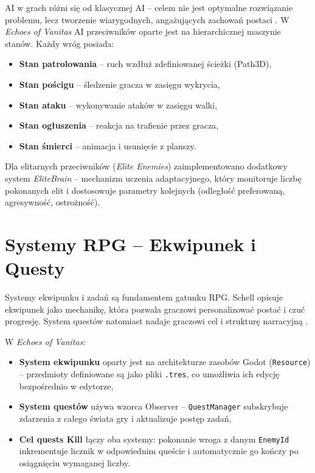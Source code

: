 AI w grach różni się od klasycznej AI – celem nie jest optymalne rozwiązanie problemu, lecz tworzenie wiarygodnych, angażujących zachowań postaci \cite{millington2009ai}. W \textit{Echoes of Vanitas} AI przeciwników oparte jest na hierarchicznej maszynie stanów. Każdy wróg posiada:

\begin{itemize}
    \item \textbf{Stan patrolowania} – ruch wzdłuż zdefiniowanej ścieżki (Path3D),
    \item \textbf{Stan pościgu} – śledzenie gracza w zasięgu wykrycia,
    \item \textbf{Stan ataku} – wykonywanie ataków w zasięgu walki,
    \item \textbf{Stan ogłuszenia} – reakcja na trafienie przez gracza,
    \item \textbf{Stan śmierci} – animacja i usunięcie z planszy.
\end{itemize}

Dla elitarnych przeciwników (\textit{Elite Enemies}) zaimplementowano dodatkowy system \textit{EliteBrain} – mechanizm uczenia adaptacyjnego, który monitoruje liczbę pokonanych elit i dostosowuje parametry kolejnych (odległość preferowaną, agresywność, ostrożność).

\section{Systemy RPG – Ekwipunek i Questy}

Systemy ekwipunku i zadań są fundamentem gatunku RPG. Schell \cite{schell2008art} opisuje ekwipunek jako mechanikę, która pozwala graczowi personalizować postać i czuć progresję. System questów natomiast nadaje graczowi cel i strukturę narracyjną \cite{salen2004rules}.

W \textit{Echoes of Vanitas}:
\begin{itemize}
    \item \textbf{System ekwipunku} oparty jest na architekturze zasobów Godot (\texttt{Resource}) – przedmioty definiowane są jako pliki \texttt{.tres}, co umożliwia ich edycję bezpośrednio w edytorze,
    \item \textbf{System questów} używa wzorca Observer – \texttt{QuestManager} subskrybuje zdarzenia z całego świata gry i aktualizuje postęp zadań,
    \item \textbf{Cel quests Kill} łączy oba systemy: pokonanie wroga z danym \texttt{EnemyId} inkrementuje licznik w odpowiednim queście i automatycznie go kończy po osiągnięciu wymaganej liczby.
\end{itemize}

